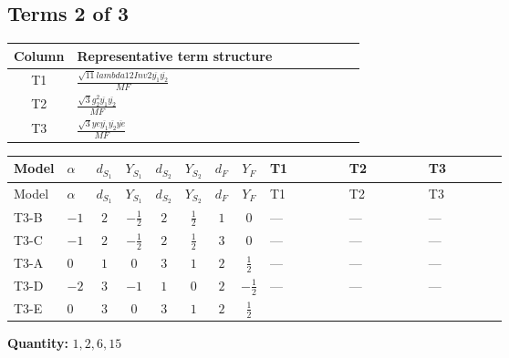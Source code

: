 \documentclass[8pt]{article}
\begin{document}
\begin{landscape}
\subsection*{Terms 2 of 3}
\begin{center}
\begin{tabular}{@{}c >{\raggedright\arraybackslash}p{0.82\linewidth}@{}}
\toprule
Column & Representative term structure \\
\midrule
T1 & \(\displaystyle \frac{\sqrt{11} lambda12Inv2 \overline{y_{1}} \overline{y_{2}}}{MF}\) \\
\midrule
T2 & \(\displaystyle \frac{\sqrt{3} g_{2}^{2} \overline{y_{1}} \overline{y_{2}}}{MF}\) \\
\midrule
T3 & \(\displaystyle \frac{\sqrt{3} ye \overline{y_{1}} \overline{y_{2}} \overline{ye}}{MF}\) \\
\midrule
\bottomrule
\end{tabular}
\end{center}
\smallskip
\tiny
\begin{longtable}{@{}llcccccc >{\raggedright\arraybackslash}p{0.21\linewidth} >{\raggedright\arraybackslash}p{0.21\linewidth} >{\raggedright\arraybackslash}p{0.21\linewidth}@{}}
\toprule
Model & $\alpha$ & $d_{S_1}$ & $Y_{S_1}$ & $d_{S_2}$ & $Y_{S_2}$ & $d_F$ & $Y_F$ & T1 & T2 & T3 \\
\midrule
\endfirsthead
\toprule
Model & $\alpha$ & $d_{S_1}$ & $Y_{S_1}$ & $d_{S_2}$ & $Y_{S_2}$ & $d_F$ & $Y_F$ & T1 & T2 & T3 \\
\midrule
\endhead
T3-B & $-1$ & $2$ & $-\frac{1}{2}$ & $2$ & $\frac{1}{2}$ & $1$ & $0$ & --- & --- & --- \\
\midrule
T3-C & $-1$ & $2$ & $-\frac{1}{2}$ & $2$ & $\frac{1}{2}$ & $3$ & $0$ & --- & --- & --- \\
\midrule
T3-A & $0$ & $1$ & $0$ & $3$ & $1$ & $2$ & $\frac{1}{2}$ & --- & --- & --- \\
\midrule
T3-D & $-2$ & $3$ & $-1$ & $1$ & $0$ & $2$ & $-\frac{1}{2}$ & --- & --- & --- \\
\midrule
T3-E & $0$ & $3$ & $0$ & $3$ & $1$ & $2$ & $\frac{1}{2}$ & \scriptsize\adjustbox{max width=\linewidth}{$\begin{gathered} \frac{3 \sqrt{11} lambda12Inv2 \overline{y_{1}} \overline{y_{2}}}{22 MF}\end{gathered}$} & \scriptsize\adjustbox{max width=\linewidth}{$\begin{gathered} \frac{15 \sqrt{3} g_{2}^{2} \overline{y_{1}} \overline{y_{2}}}{8 MF}\end{gathered}$} & \scriptsize\adjustbox{max width=\linewidth}{$\begin{gathered} - \frac{\sqrt{3} ye \overline{y_{1}} \overline{y_{2}} \overline{ye}}{12 MF}\end{gathered}$} \\
\midrule
\bottomrule
\end{longtable}
\clearpage
\noindent\textbf{Quantity: }$\mathrm{1,2,6,15}$\par\smallskip

\end{landscape}
\end{document}
